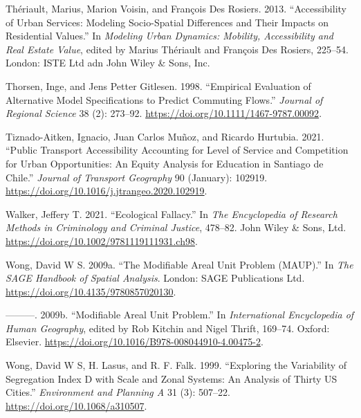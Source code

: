 \documentclass{article}
\newlength{\cslhangindent}
\newenvironment{CSLReferences}[2] %
 {\begin{list}{}{%
  \setlength{\itemindent}{0pt}
  \setlength{\leftmargin}{0pt}
  \setlength{\parsep}{0pt}
  \ifodd #1
   \setlength{\leftmargin}{\cslhangindent}
   \setlength{\itemindent}{-1\cslhangindent}
  \fi
  \setlength{\itemsep}{#2\baselineskip}}}
 {\end{list}}
\begin{document}
\begin{CSLReferences}{1}{0}
Thériault, Marius, Marion Voisin, and François Des Rosiers. 2013.
{``Accessibility of {Urban Services}: {Modeling Socio}-Spatial
{Differences} and Their {Impacts} on {Residential Values}.''} In
\emph{Modeling {Urban Dynamics}: {Mobility}, {Accessibility} and {Real
Estate Value}}, edited by Marius Thériault and François Des Rosiers,
225--54. London: ISTE Ltd adn John Wiley \& Sons, Inc.

Thorsen, Inge, and Jens Petter Gitlesen. 1998. {``Empirical Evaluation
of Alternative Model Specifications to Predict Commuting Flows.''}
\emph{Journal of Regional Science} 38 (2): 273--92.
\url{https://doi.org/10.1111/1467-9787.00092}.

Tiznado-Aitken, Ignacio, Juan Carlos Muñoz, and Ricardo Hurtubia. 2021.
{``Public Transport Accessibility Accounting for Level of Service and
Competition for Urban Opportunities: {An} Equity Analysis for Education
in {Santiago} de {Chile}.''} \emph{Journal of Transport Geography} 90
(January): 102919. \url{https://doi.org/10.1016/j.jtrangeo.2020.102919}.

Walker, Jeffery T. 2021. {``Ecological {Fallacy}.''} In \emph{The
{Encyclopedia} of {Research Methods} in {Criminology} and {Criminal
Justice}}, 478--82. John Wiley \& Sons, Ltd.
\url{https://doi.org/10.1002/9781119111931.ch98}.

Wong, David W S. 2009a. {``The {Modifiable Areal Unit Problem}
({MAUP}).''} In \emph{The {SAGE Handbook} of {Spatial Analysis}}.
London: SAGE Publications Ltd.
\url{https://doi.org/10.4135/9780857020130}.

---------. 2009b. {``Modifiable {Areal Unit Problem}.''} In
\emph{International {Encyclopedia} of {Human Geography}}, edited by Rob
Kitchin and Nigel Thrift, 169--74. Oxford: Elsevier.
\url{https://doi.org/10.1016/B978-008044910-4.00475-2}.

Wong, David W S, H. Lasus, and R. F. Falk. 1999. {``Exploring the
Variability of Segregation Index {D} with Scale and Zonal Systems: An
Analysis of Thirty {US} Cities.''} \emph{Environment and Planning A} 31
(3): 507--22. \url{https://doi.org/10.1068/a310507}.

\end{CSLReferences}



\end{document}
